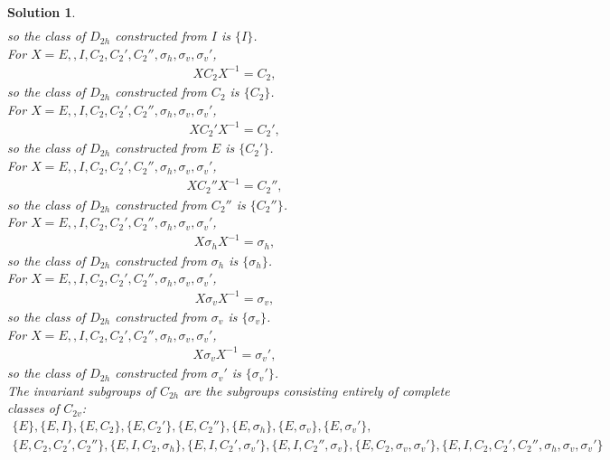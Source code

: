 \documentclass[UTF8,10pt,a4paper]{article}
\theoremstyle{Problem}
\theoremstyle{Solution}
\newtheorem*{sol}{Solution}
\begin{document}
\begin{sol}
\begin{align}
    \end{align}
    so the class of $D_{2h}$ constructed from $I$ is $\{I\}$.\\
    For $X=E,,I,C_2,C_2',C_2'',\sigma_h,\sigma_v,\sigma_v'$,
    \begin{align}
        XC_2X^{-1}=C_2,
    \end{align}
    so the class of $D_{2h}$ constructed from $C_2$ is $\{C_2\}$.\\
    For $X=E,,I,C_2,C_2',C_2'',\sigma_h,\sigma_v,\sigma_v'$,
    \begin{align}
        XC_2'X^{-1}=C_2',
    \end{align}
    so the class of $D_{2h}$ constructed from $E$ is $\{C_2'\}$.\\
    For $X=E,,I,C_2,C_2',C_2'',\sigma_h,\sigma_v,\sigma_v'$,
    \begin{align}
        XC_2''X^{-1}=C_2'',
    \end{align}
    so the class of $D_{2h}$ constructed from $C_2''$ is $\{C_2''\}$.\\
    For $X=E,,I,C_2,C_2',C_2'',\sigma_h,\sigma_v,\sigma_v'$,
    \begin{align}
        X\sigma_hX^{-1}=\sigma_h,
    \end{align}
    so the class of $D_{2h}$ constructed from $\sigma_h$ is $\{\sigma_h\}$.\\
    For $X=E,,I,C_2,C_2',C_2'',\sigma_h,\sigma_v,\sigma_v'$,
    \begin{align}
        X\sigma_vX^{-1}=\sigma_v,
    \end{align}
    so the class of $D_{2h}$ constructed from $\sigma_v$ is $\{\sigma_v\}$.\\
    For $X=E,,I,C_2,C_2',C_2'',\sigma_h,\sigma_v,\sigma_v'$,
    \begin{align}
        X\sigma_vX^{-1}=\sigma_v',
    \end{align}
    so the class of $D_{2h}$ constructed from $\sigma_v'$ is $\{\sigma_v'\}$.\\
    The invariant subgroups of $C_{2h}$ are the subgroups consisting entirely of complete classes of $C_{2v}$:
    \begin{gather*}
        \{E\},\{E,I\},\{E,C_2\},\{E,C_2'\},\{E,C_2''\},\{E,\sigma_h\},\{E,\sigma_v\},\{E,\sigma_v'\},\\
        \{E,C_2,C_2',C_2''\},\{E,I,C_2,\sigma_h\},\{E,I,C_2',\sigma_v'\},\{E,I,C_2'',\sigma_v\},\{E,C_2,\sigma_v,\sigma_v'\},\{E,I,C_2,C_2',C_2'',\sigma_h,\sigma_v,\sigma_v'\}
    \end{gather*}
\end{sol}
\end{document}
